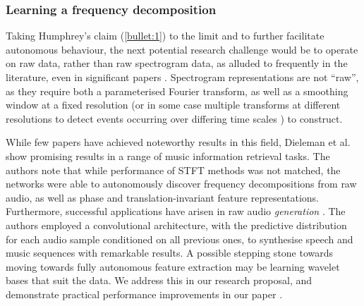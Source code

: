 \documentclass[12pt]{llncs}
\begin{document}

	




\subsubsection{Learning a frequency decomposition}

Taking Humphrey's claim (\ref{bullet:1}) to the limit and to further facilitate autonomous behaviour, the next potential research challenge would be to operate on raw data, rather than raw spectrogram data, as alluded to frequently in the literature, even in significant papers \cite{lee2009unsupervised}. Spectrogram representations are not ``raw'', as they require both a parameterised Fourier transform, as well as a smoothing window at a fixed resolution (or in some case multiple transforms at different resolutions to detect events occurring over differing time scales \cite{espi2015exploiting}) to construct.

While few papers have achieved noteworthy results in this field, Dieleman et al. \cite{dieleman2014end} show promising results in a range of music information retrieval tasks. The authors note that while performance of STFT methods was not matched, the networks were able to autonomously discover frequency decompositions from raw audio, as well as phase and translation-invariant feature representations. Furthermore, successful applications have arisen in raw audio \emph{generation} \cite{van2016wavenet}. The authors employed a convolutional architecture, with the predictive distribution for each audio sample conditioned on all previous ones, to synthesise speech and music sequences with remarkable results. A possible stepping stone towards moving towards fully autonomous feature extraction may be learning wavelet bases that suit the data. We address this in our research proposal, and demonstrate practical performance improvements in our paper \cite[Section 5]{kiskin2017mosquito}.
\end{document}
